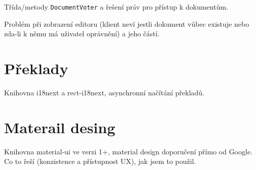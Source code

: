 Třída/metody \texttt{DocumentVoter} a řešení práv pro přístup k dokumentům.

Problém při zobrazení editoru (klient neví jestli dokument vůbec existuje nebo zda-li k němu má uživatel oprávnění) a jeho částí.

\section{Překlady}

Knihovna i18next a rect-i18next, asynchronní načítání překladů.

\section{Materail desing}

Knihovna material-ui ve verzi 1+, material design doporučení přímo od Google.
Co to řeší (konzistence a přístupnost UX), jak jsem to použil.

